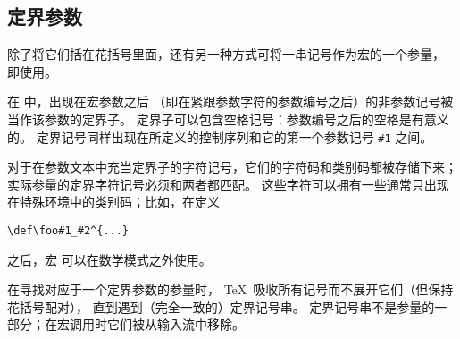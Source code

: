 \documentclass{book}
\begin{document}
\subsection{定界参数}

除了将它们括在花括号里面，还有另一种方式可将一串记号作为宏的一个参量，
即使用。

在  中，出现在宏参数之后%
（即在紧跟参数字符的参数编号之后）的非参数记号被当作该参数的定界子。
定界子可以包含空格记号：参数编号之后的空格是有意义的。
定界记号同样出现在所定义的控制序列和它的第一个参数记号 \verb>#1> 之间。

对于在参数文本中充当定界子的字符记号，它们的字符码和类别码都被存储下来；
实际参量的定界字符记号必须和两者都匹配。
这些字符可以拥有一些通常只出现在特殊环境中的类别码；比如，在定义
\begin{verbatim}
\def\foo#1_#2^{...}
\end{verbatim}
之后，宏  可以在数学模式之外使用。

在寻找对应于一个定界参数的参量时，
\TeX\ 吸收所有记号而不展开它们（但保持花括号配对），
直到遇到（完全一致的）定界记号串。
定界记号串不是参量的一部分；在宏调用时它们被从输入流中移除。
\end{document}
